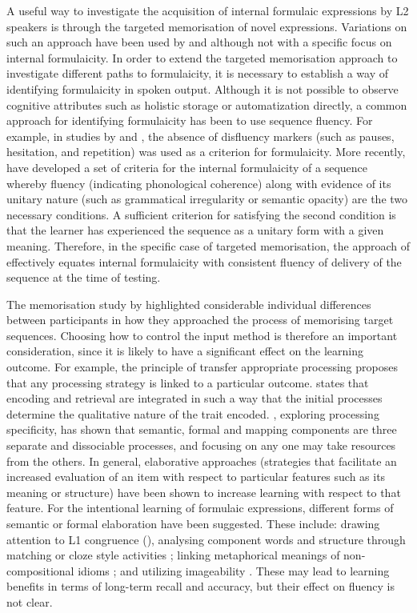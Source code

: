\documentclass[output=paper]{langscibook}
\begin{document}
A useful way to investigate the acquisition of internal formulaic expressions by L2 speakers is through the targeted memorisation of novel expressions. Variations on such an approach have been used by \citet{Wray2004} and \citet{FitzpatrickWray2006} although not with a specific focus on internal formulaicity. In order to extend the targeted memorisation approach to investigate different paths to formulaicity, it is necessary to establish a way of identifying formulaicity in spoken output. Although it is not possible to observe cognitive attributes such as holistic storage or automatization directly, a common approach for identifying formulaicity has been to use sequence fluency. For example, in studies by \citet{Erman2007} and \citet{Dahlmann2009}, the absence of disfluency markers (such as pauses, hesitation, and repetition) was used as a criterion for formulaicity. More recently, \citet{MylesCordier2017} have developed a set of criteria for the internal formulaicity of a sequence whereby fluency (indicating phonological coherence) along with evidence of its unitary nature (such as grammatical irregularity or semantic opacity) are the two necessary conditions. A sufficient criterion for satisfying the second condition is that the learner has experienced the sequence as a unitary form with a given meaning. Therefore, in the specific case of targeted memorisation, the approach of \citet{MylesCordier2017} effectively equates internal formulaicity with consistent fluency of delivery of the sequence at the time of testing.

The memorisation study by \citet{FitzpatrickWray2006} highlighted considerable individual differences between participants in how they approached the process of memorising target sequences. Choosing how to control the input method is therefore an important consideration, since it is likely to have a significant effect on the learning outcome. For example, the principle of transfer appropriate processing \citep{RoedigerEtAl2002} proposes that any processing strategy is linked to a particular outcome. \citet{Craik2002} states that encoding and retrieval are integrated in such a way that the initial processes determine the qualitative nature of the trait encoded. \citet{Barcroft2002, Barcroft2006}, exploring processing specificity, has shown that semantic, formal and mapping components are three separate and dissociable processes, and focusing on any one may take resources from the others. In general, elaborative approaches (strategies that facilitate an increased evaluation of an item with respect to particular features such as its meaning or structure) have been shown to increase learning with respect to that feature. For the intentional learning of formulaic expressions, different forms of semantic or formal elaboration have been suggested. These include: drawing attention to L1 congruence (\citealt{ConklinCarrol2019}), analysing component words and structure through matching or cloze style activities \citep{BoersEtAl2014}; linking metaphorical meanings of non-compositional idioms \citep{BoersEtAl2007}; and utilizing imageability \citep{SteinelEtAl2007}. These may lead to learning benefits in terms of long-term recall and accuracy, but their effect on fluency is not clear.
\end{document}
